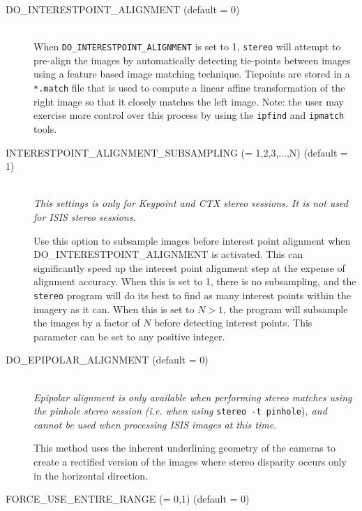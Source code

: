 \begin{description}
\item[DO\_INTERESTPOINT\_ALIGNMENT \textnormal (default = 0)] \hfill \\

  When \texttt{DO\_INTERESTPOINT\_ALIGNMENT} is set to 1,
  \texttt{stereo} will attempt to pre-align the images by
  automatically detecting tie-points between images using a feature
  based image matching technique. Tiepoints are stored in a
  \texttt{*.match} file that is used to compute a linear affine
  transformation of the right image so that it closely matches the
  left image.  Note: the user may exercise more control over this
  process by using the \texttt{ipfind} and \texttt{ipmatch} tools.

\item[INTERESTPOINT\_ALIGNMENT\_SUBSAMPLING \textnormal{\small{(= 1,2,3,...,N)}} (default = 1)]\hfill \\

  {\em This settings is only for Keypoint and CTX stereo sessions.  It
    is not used for ISIS stereo sessions.}

  Use this option to subsample images before interest point alignment
  when DO\_INTERESTPOINT\_ALIGNMENT is activated.  This can
  significantly speed up the interest point alignment step at the
  expense of alignment accuracy.  When this is set to 1, there is no
  subsampling, and the \texttt{stereo} program will do its best to
  find as many interest points within the imagery as it can.  When
  this is set to $N > 1$, the program will subsample the images by a
  factor of $N$ before detecting interest points.  This parameter can
  be set to any positive integer.

\item[DO\_EPIPOLAR\_ALIGNMENT \textnormal (default = 0)] \hfill \\

  {\em Epipolar alignment is only available when performing stereo
    matches using the pinhole stereo session (i.e. when using}
    \texttt{stereo -t pinhole}){\em, and cannot be used when processing
    ISIS images at this time.}

  This method uses the inherent underlining geometry of the cameras to
  create a rectified version of the images where stereo disparity
  occurs only in the horizontal direction.

\item[FORCE\_USE\_ENTIRE\_RANGE \textnormal{\small{(= 0,1)}} (default = 0)] \hfill \\


\end{description}
